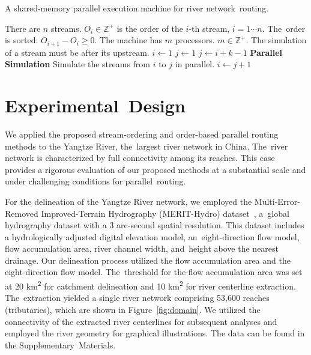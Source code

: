 \documentclass[water,article,accept,pdftex,moreauthors]{Definitions/mdpi}
\begin{document}
\begin{algorithm}
    \caption{A shared-memory parallel execution machine for river network~routing.}
    \label{alg:shared_memory}
    \begin{algorithmic}
        \REQUIRE There are $n$ streams. $O_i \in \mathbb{Z}^{+}$ is the order of the $i$-th stream, $i = 1\cdots{}n$. The~order is sorted: $O_{i+1} - O_i \ge 0$.
        \REQUIRE The machine has $m$ processors. $m \in \mathbb{Z}^{+}$.
        \ENSURE The simulation of a stream must be after its upstream.
        \STATE $i \gets 1$ 
        \STATE $j \gets 1$ 
        \STATE $j \gets i + k - 1$
        \ENDIF
        \ENDFOR
        \STATE \textbf{Parallel Simulation} Simulate the streams from $i$ to $j$ in parallel.
        \STATE $i \gets j + 1$
        \ENDWHILE
    \end{algorithmic}
\end{algorithm}

\vspace{-12pt}
\section{Experimental~Design}
\label{sec:domain}

We applied the proposed stream-ordering and order-based parallel routing methods to the Yangtze River, the~largest river network in China. The~river network is characterized by full connectivity among its reaches. This case provides a rigorous evaluation of our proposed methods at a substantial scale and under challenging conditions for parallel~routing.

For the delineation of the Yangtze River network, we employed the Multi-Error-Removed Improved-Terrain Hydrography (MERIT-Hydro) dataset~\cite{yamazaki2017GRL, yamazaki2019WRR}, a~global hydrography dataset with a 3 arc-second spatial resolution. This dataset includes a hydrologically adjusted digital elevation model, an~eight-direction flow model, flow accumulation area, river channel width, and~height above the nearest drainage. Our delineation process utilized the flow accumulation area and the eight-direction flow model. The~threshold for the flow accumulation area was set at 20 km\textsuperscript{2} for catchment delineation and 10 km\textsuperscript{2} for river centerline extraction. The~extraction yielded a single river network comprising 53,600 reaches (tributaries), which are shown in Figure~\ref{fig:domain}. We utilized the connectivity of the extracted river centerlines for subsequent analyses and employed the river geometry for graphical illustrations. The data can be found in the Supplementary~Materials.
\end{document}
